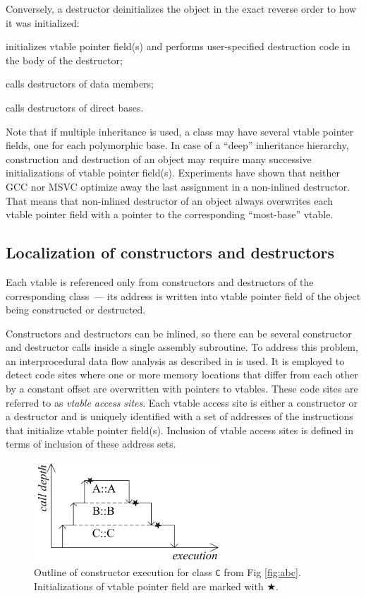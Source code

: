 \documentclass[times, 10pt,twocolumn]{article}
\renewcommand{\~}{{\raise.35ex\hbox{$\scriptstyle\sim$}}}
\newcounter{xcounter}
\renewenvironment{enumerate}{
    \begin{list}{\arabic{xcounter})}{\usecounter{xcounter} \itemsep=-\parsep}
}{
	\end{list}
}
\begin{document}
Conversely, a destructor deinitializes the object
in the exact reverse order to how it was initialized:
\begin{enumerate}
\item initializes vtable pointer field(s) and
    performs user-specified destruction code in the body of the destructor;
\item calls destructors of data members;
\item calls destructors of direct bases.
\end{enumerate}

Note that if multiple inheritance is used, a class may have
several vtable pointer fields, one for each polymorphic base.
In case of a ``deep'' inheritance hierarchy,
construction and destruction of an object may require many
successive initializations of vtable pointer field(s).
Experiments have shown that neither GCC nor MSVC optimize away
the last assignment in a non-inlined destructor.
That means that non-inlined destructor of an object always overwrites each
vtable pointer field with a pointer to the corresponding ``most-base'' vtable.




\quad
\subsection{Localization of constructors and destructors}\label{chapterLocalization}
Each vtable is referenced only from constructors and destructors
of the corresponding class~--- its address is written into
vtable pointer field of the object being constructed or destructed.

Constructors and destructors can be inlined, so there
can be several constructor and destructor calls inside a single
assembly subroutine.
To address this problem, an interprocedural data flow analysis as described
in \cite{aho06} is used. 
It is employed to detect code sites where one or more memory locations that
differ from each other by a constant offset are overwritten with
pointers to vtables.
These code sites are referred to as \textit{vtable access sites}.
Each vtable access site is either a constructor or a destructor
and is uniquely identified with a set of addresses
of the instructions that initialize vtable pointer field(s).
Inclusion of vtable access sites is defined in terms of
inclusion of these address sets.

\begin{figure}[tb!]
\centering
  \includegraphics[width=7.0cm]{images/ctor}
\caption{Outline of constructor execution for class \lstinline{C} from Fig \ref{fig:abc}.
Initializations of vtable pointer field are marked with $\bigstar$.}
\label{fig:ctor}
\end{figure}
\end{document}
